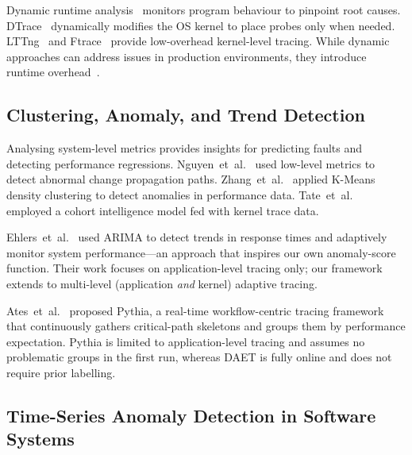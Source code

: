 \documentclass[pdflatex,sn-nature]{sn-jnl}
\theoremstyle{thmstyleone}%
\begin{document}
Dynamic runtime analysis~\cite{arulraj2013production,dean2014perfscope}
monitors program behaviour to pinpoint root causes.
DTrace~\cite{cantrill2004dynamic} dynamically modifies the OS kernel to
place probes only when needed.
LTTng~\cite{desnoyers2006lttng} and Ftrace~\cite{rostedt2010ftrace} provide
low-overhead kernel-level tracing.
While dynamic approaches can address issues in production environments,
they introduce runtime overhead~\cite{arulraj2013production,dean2014perfscope}.

\subsection{Clustering, Anomaly, and Trend Detection}
Analysing system-level metrics provides insights for predicting faults and
detecting performance regressions.
Nguyen~et~al.~\cite{nguyen2013fchain} used low-level metrics to detect
abnormal change propagation paths.
Zhang~et~al.~\cite{zhang2020diagnostic} applied K-Means density
clustering to detect anomalies in performance data.
Tate~et~al.~\cite{tate2017optimization} employed a cohort intelligence model
fed with kernel trace data.

Ehlers~et~al.~\cite{ehlers2011self} used ARIMA to detect trends in response
times and adaptively monitor system performance---an approach that inspires
our own anomaly-score function.
Their work focuses on application-level tracing only; our framework extends
to multi-level (application \emph{and} kernel) adaptive tracing.

Ates~et~al.~\cite{ates2019automated} proposed Pythia, a real-time
workflow-centric tracing framework that continuously gathers critical-path
skeletons and groups them by performance expectation.
Pythia is limited to application-level tracing and assumes no problematic
groups in the first run, whereas DAET is fully online and does not require
prior labelling.

\subsection{Time-Series Anomaly Detection in Software Systems}
\end{document}
